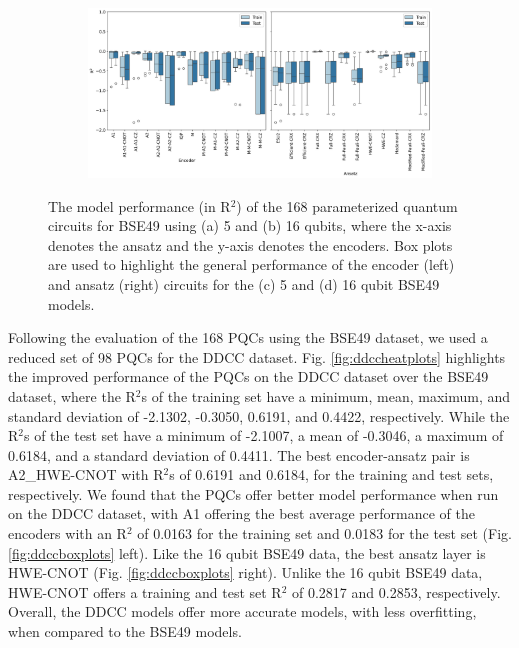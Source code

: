 \documentclass[journal=jacsat,manuscript=article]{achemso}
\begin{document}
\begin{figure}[H]
\begin{subfigure}[b]{0.49\textwidth}
		\caption{}
		\label{fig:5BSE_boxplots}
	\end{subfigure}
	\hfill
	\begin{subfigure}[b]{0.49\textwidth}
		\centering
		\includegraphics[width=\linewidth]{../images/BSE/sixteenqubit/BSE_boxplots}
		\caption{}
		\label{fig:16BSE_boxplots}
	\end{subfigure}
	\caption{The model performance (in R$^{2}$) of the 168 parameterized quantum circuits for BSE49 using (a) 5 and (b) 16 qubits, where the x-axis denotes the ansatz and the y-axis denotes the encoders. Box plots are used to highlight the general performance of the encoder (left) and ansatz (right) circuits for the (c) 5 and (d) 16 qubit BSE49 models.}
	\label{fig:BSEboxandheat}	
\end{figure}

Following the evaluation of the 168 PQCs using the BSE49 dataset, we used a reduced set of 98 PQCs for the DDCC dataset.
Fig. \ref{fig:ddccheatplots} highlights the improved performance of the PQCs on the DDCC dataset over the BSE49 dataset, where the R$^{2}$s of the training set have a minimum, mean, maximum, and standard deviation of -2.1302, -0.3050, 0.6191, and 0.4422, respectively.
While the R$^{2}$s of the test set have a minimum of -2.1007, a mean of -0.3046, a maximum of 0.6184, and a standard deviation of 0.4411.
The best encoder-ansatz pair is A2{\_}HWE-CNOT with R$^{2}$s of 0.6191 and 0.6184, for the training and test sets, respectively.
We found that the PQCs offer better model performance when run on the DDCC dataset, with A1 offering the best average performance of the encoders with an R$^{2}$ of 0.0163 for the training set and 0.0183 for the test set (Fig. \ref{fig:ddccboxplots} left).
Like the 16 qubit BSE49 data, the best ansatz layer is HWE-CNOT (Fig. \ref{fig:ddccboxplots} right).
Unlike the 16 qubit BSE49 data, HWE-CNOT offers a training and test set R$^{2}$ of 0.2817 and 0.2853, respectively.
Overall, the DDCC models offer more accurate models, with less overfitting, when compared to the BSE49 models.
\end{document}
